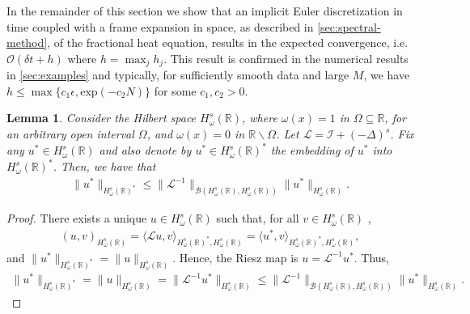 \documentclass[10pt,a4paper]{article}
\newtheorem{lemma}{Lemma}[section]
\numberwithin{equation}{section}
\begin{document}
In the remainder of this section we show that an implicit Euler discretization in time coupled with a frame expansion  in space, as described in \cref{sec:spectral-method}, of the fractional heat equation, results in the expected convergence, i.e.~$\mathcal{O}(\delta t + h)$ where $h  =\max_j h_j$. This result is confirmed in the numerical results in \cref{sec:examples} and typically, for sufficiently smooth data and large $M$, we have $h \leq \max \{ c_1\epsilon, \mathrm{exp}(-c_2N) \}$ for some $c_1, c_2 > 0$.

\begin{lemma}
\label{lem:bounded}
Consider the Hilbert space $H^s_\omega(\mathbb{R})$, where $\omega(x) = 1$ in $\Omega \subseteq \mathbb{R}$, for an arbitrary open interval $\Omega$, and $\omega(x) = 0$ in $\mathbb{R} \backslash \Omega$. Let $\mathcal{L} = \mathcal{I} + (-\Delta)^s$. Fix any $u^* \in H^s_\omega(\mathbb{R})$ and also denote by $u^* \in H^s_\omega(\mathbb{R})^*$ the embedding of $u^*$ into $H^s_\omega(\mathbb{R})^*$. Then, we have that
\begin{align}
\| u^* \|_{H^s_\omega(\mathbb{R})^*} \leq \| \mathcal{L}^{-1} \|_{\mathcal{B}(H^s_\omega(\mathbb{R}),H^s_\omega(\mathbb{R}))} \| u^* \|_{H^s_\omega(\mathbb{R})}.
\end{align}
\end{lemma}
\begin{proof}
There exists a unique $u \in H^s_\omega(\mathbb{R})$ such that, for all $v \in H^s_\omega(\mathbb{R})$  \cite[Ch.~D.3, Th.~2]{Evans2010},
\begin{align}
(u, v)_{H^s_\omega(\mathbb{R})} = \langle \mathcal{L} u, v \rangle_{H^s_\omega(\mathbb{R})^*,H^s_\omega(\mathbb{R})} = \langle u^*, v \rangle_{H^s_\omega(\mathbb{R})^*,H^s_\omega(\mathbb{R})},
\end{align}
and $\| u^*\|_{H^s_\omega(\mathbb{R})^*} = \| u \|_{H^s_\omega(\mathbb{R})}$. Hence, the Riesz map is $u = \mathcal{L}^{-1} u^*$. Thus,
\begin{align}
\| u^*\|_{H^s_\omega(\mathbb{R})^*} = \| u \|_{H^s_\omega(\mathbb{R})} = \|  \mathcal{L}^{-1} u^* \|_{H^s_\omega(\mathbb{R})} \leq \| \mathcal{L}^{-1} \|_{\mathcal{B}(H^s_\omega(\mathbb{R}),H^s_\omega(\mathbb{R}))} \| u^* \|_{H^s_\omega(\mathbb{R})}.
\end{align}
\end{proof}
\end{document}
